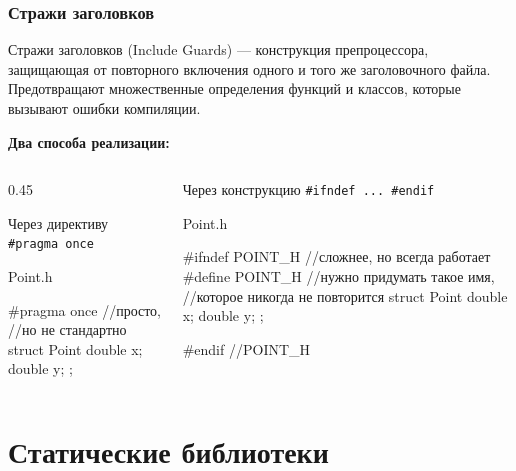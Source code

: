 \documentclass[9pt, aspectratio=1610]{beamer}
\begin{document}
\begin{frame}[fragile]\frametitle{Стражи заголовков}
	
	\begin{alertblock}{Стражи заголовков (Include Guards) --- }
		конструкция препроцессора, защищающая от повторного включения одного и того же заголовочного файла. Предотвращают множественные определения функций и классов, которые вызывают ошибки компиляции.
	\end{alertblock}
	
	\pause\textbf{Два способа реализации:}
	
	\begin{columns}[]
		\edef\colA{0.45}
		\begin{column}[t]{\colA\linewidth}
			
			Через директиву \verb|#pragma once| 
			
			\begin{block}{Point.h}
				\begin{cppcode}
					#pragma once //просто, 
					//но не стандартно
					struct Point
					{
						double x;
						double y;
					};
				\end{cppcode} 
				
			\end{block}  
		\end{column} \pause
		\begin{column}[t]{\fpeval{1-\colA}\linewidth}
			
			Через конструкцию \verb|#ifndef ... #endif| 
			
			\begin{block}{Point.h}
				\begin{cppcode}
					#ifndef POINT_H //сложнее, но всегда работает
					#define POINT_H //нужно придумать такое имя,
					//которое никогда не повторится
					struct Point
					{
						double x;
						double y;
					};
					
					#endif //POINT_H
				\end{cppcode}
			\end{block}
		\end{column}
	\end{columns}
	
\end{frame}



\section {Статические библиотеки}
\end{document}
